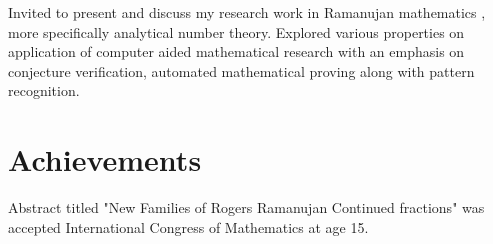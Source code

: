 \documentclass[]{deedy-resume-openfont}
\begin{document}
\begin{minipage}[t]{0.66\textwidth}
Invited to present and discuss my research work in Ramanujan mathematics , more specifically analytical number theory. Explored various properties on application of computer aided mathematical research with an emphasis on conjecture verification, automated mathematical proving along with pattern recognition.
\sectionsep

\end{minipage} 


\section{Achievements}

\vspace{\topsep} %
\begin{tightemize}\item Abstract titled "New Families of Rogers Ramanujan Continued fractions" was accepted International Congress of Mathematics at age 15.
\end{tightemize}
\sectionsep
\end{document}
